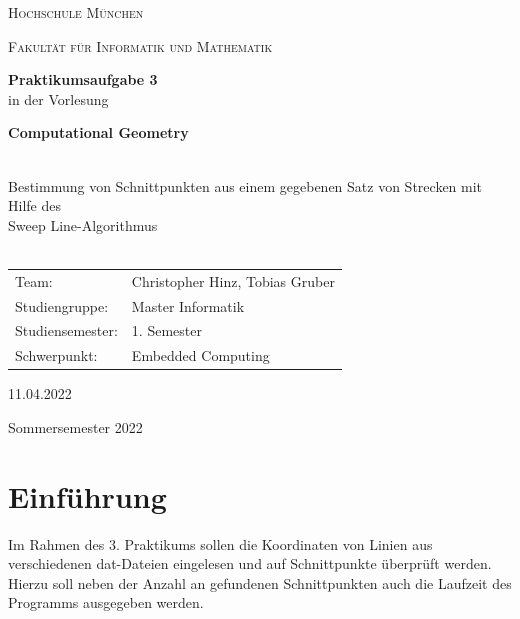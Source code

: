 \documentclass[12pt]{scrartcl}
\begin{document}
\begin{titlepage}
    \vfill
	\centering
    \vspace{1.5cm}

	{\scshape\LARGE Hochschule München \par}
    {\scshape\Large Fakultät für Informatik und Mathematik\par}
	\vspace{1.5cm}




    \vfill
    {\LARGE\bfseries Praktikumsaufgabe 3 \\}
    \vspace{0.5cm}
	{in der Vorlesung\\}
    \vspace{0.5cm}
    {\LARGE\bfseries Computational Geometry\\~\\ \par}
	{\LARGE Bestimmung von Schnittpunkten aus einem gegebenen Satz von Strecken mit Hilfe des \\Sweep Line-Algorithmus\\~\\ \par}
	\vfill
    \vfill


    \begin{tabular}{ll}
    \normalsize
    Team:  & Christopher Hinz, Tobias Gruber\\
    Studiengruppe: & Master Informatik\\
    Studiensemester: & 1. Semester\\
    Schwerpunkt: & Embedded Computing\\
    \end{tabular}
    \vspace{1.5cm}

    11.04.2022

    \vspace{0.5cm}

    Sommersemester 2022

	\vfill

\end{titlepage}

\newpage

\section{Einführung}
Im Rahmen des 3. Praktikums sollen die Koordinaten von Linien aus verschiedenen dat-Dateien eingelesen und auf Schnittpunkte überprüft werden.
Hierzu soll neben der Anzahl an gefundenen Schnittpunkten auch die Laufzeit des Programms ausgegeben werden.
\end{document}
